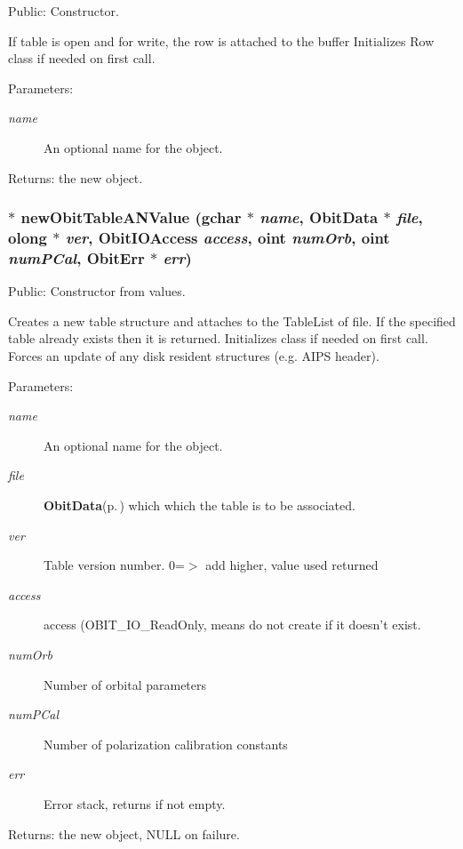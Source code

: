 Public: Constructor. 

If table is open and for write, the row is attached to the buffer Initializes Row class if needed on first call. \begin{Desc}
\item[Parameters:]
\begin{description}
\item[{\em name}]An optional name for the object. \end{description}
\end{Desc}
\begin{Desc}
\item[Returns:]the new object. \end{Desc}
\subsubsection{$\ast$ new\-Obit\-Table\-ANValue (gchar $\ast$ {\em name}, {\bf Obit\-Data} $\ast$ {\em file}, {\bf olong} $\ast$ {\em ver}, Obit\-IOAccess {\em access}, {\bf oint} {\em num\-Orb}, {\bf oint} {\em num\-PCal}, {\bf Obit\-Err} $\ast$ {\em err})}\label{ObitTableAN_8h_a12}


Public: Constructor from values. 

Creates a new table structure and attaches to the Table\-List of file. If the specified table already exists then it is returned. Initializes class if needed on first call. Forces an update of any disk resident structures (e.g. AIPS header). \begin{Desc}
\item[Parameters:]
\begin{description}
\item[{\em name}]An optional name for the object. \item[{\em file}]{\bf Obit\-Data}{\rm (p.\,\pageref{structObitData})} which which the table is to be associated. \item[{\em ver}]Table version number. 0=$>$ add higher, value used returned \item[{\em access}]access (OBIT\_\-IO\_\-Read\-Only, means do not create if it doesn't exist. \item[{\em num\-Orb}]Number of orbital parameters \item[{\em num\-PCal}]Number of polarization calibration constants \item[{\em err}]Error stack, returns if not empty. \end{description}
\end{Desc}
\begin{Desc}
\item[Returns:]the new object, NULL on failure. \end{Desc}
